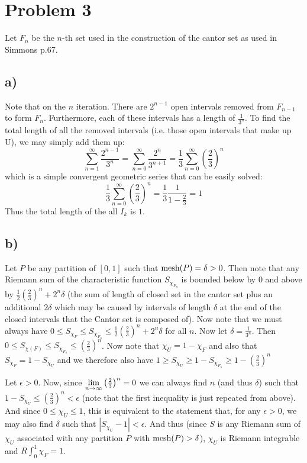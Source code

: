 \section*{Problem 3}
Let $F_n$ be the $n$-th set used in the construction of the cantor set as used in Simmons p.67. 
\subsection*{a)}
Note that on the $n$ iteration. There are $2^{n-1}$ open intervals removed from $F_{n-1}$ to form $F_n$. Furthermore, each of these intervals has a length of $\frac{1}{3^n}$. To find the total length of all the removed intervals (i.e. those open intervals that make up U), we may simply add them up:
\[ \sum\limits_{n=1}^\infty \dfrac{2^{n-1}}{3^n} = \sum\limits_{n=0}^\infty \dfrac{2^{n}}{3^{n+1}} = \dfrac{1}{3}\sum\limits_{n=0}^\infty \left(\dfrac{2}{3}\right)^n \]
which is a simple convergent geometric series that can be easily solved:
 \[ \dfrac{1}{3}\sum\limits_{n=0}^\infty \left(\dfrac{2}{3}\right)^n = \dfrac{1}{3} \dfrac{1}{1-\frac{2}{3}} = 1 \]
 Thus the total length of the all $I_k$ is $1$.
 \subsection*{b)}
Let $P$ be any partition of $[0,1]$ such that $\text{mesh}(P)=\delta>0$. Then note that any Riemann sum of the characteristic function $S_{\chi_{F_n}}$ is bounded below by 0 and above by $\frac{1}{2} \left(\frac{2}{3}\right)^n + 2^n\delta$ (the sum of length of closed set in the cantor set plus an additional $2\delta$ which may be caused by intervals of length $\delta$ at the end of the closed intervals that the Cantor set is composed of). Now note that we must always have $0\leq S_{\chi_F} \leq S_{\chi_{F_n}} \leq \frac{1}{2} \left( \frac{2}{3}\right)^n + 2^n\delta$ for all $n$. Now let $\delta=\frac{1}{3^n}$. Then $0\leq S_{\chi(F)} \leq S_{\chi_{F_n}} \leq \left(\frac{2}{3}\right)^n$. Now note that $\chi_{U}=1-\chi_{F}$ and also that $S_{\chi_{F}}=1-S_{\chi_U} $ and we therefore also have $1\geq S_{\chi_U} \geq 1- S_{\chi_{F_n}} \geq 1 - \left(\frac{2}{3}\right)^n$\par
Let $\epsilon>0$. Now, since $\lim\limits_{n\to\infty} \left(\frac{2}{3}\right)^n = 0$ we can always find $n$ (and thus $\delta$) such that $1-S_{\chi_{U}}\leq \left(\frac{2}{3}\right)^n < \epsilon$ (note that the first inequality is just repeated from above). And since $0\leq\chi_{U}\leq 1$, this is equivalent to the statement that, for any $\epsilon>0$, we may also find $\delta$ such that $|S_{\chi_{U}}-1| <\epsilon$. And thus (since $S$ is any Riemann sum of $\chi_U$ associated with any partition $P$ with $\text{mesh}(P)>\delta$), $\chi_U$ is Riemann integrable and $R\int_0^1 \chi_{F} = 1$. 


